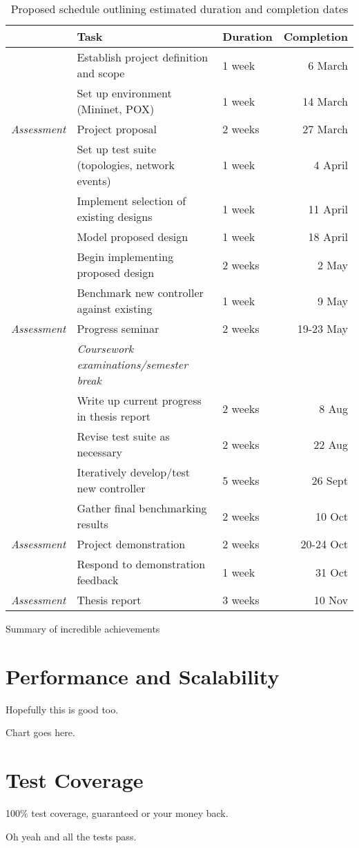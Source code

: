 \begin{table}[H]
  \begin{center}
    \begin{tabular}{@{}rllr@{}}
      \toprule
      & Task & Duration & Completion\\
      \midrule
      & Establish project definition and scope & 1 week & 6 March \\
      & Set up environment (Mininet,  POX) & 1 week & 14 March \\
      \emph{Assessment} & Project proposal & 2 weeks & 27 March \\
      & Set up test suite (topologies, network events) & 1 week & 4 April \\
      & Implement selection of existing designs & 1 week & 11 April \\
      & Model proposed design & 1 week & 18 April \\
      & Begin implementing proposed design & 2 weeks & 2 May \\
      & Benchmark new controller against existing & 1 week & 9 May \\
      \emph{Assessment} & Progress seminar & 2 weeks & 19-23 May \\
      \addlinespace
      & \emph{Coursework examinations/semester break} \\
      \addlinespace
      & Write up current progress in thesis report & 2 weeks & 8 Aug\\
      & Revise test suite as necessary & 2 weeks & 22 Aug\\
      & Iteratively develop/test new controller & 5 weeks & 26 Sept\\
      & Gather final benchmarking results & 2 weeks & 10 Oct \\
      \emph{Assessment} & Project demonstration & 2 weeks & 20-24 Oct \\
      & Respond to demonstration feedback & 1 week & 31 Oct \\
      \emph{Assessment} & Thesis report & 3 weeks & 10 Nov \\
      \bottomrule
    \end{tabular}
    \caption{Proposed schedule outlining estimated duration and completion dates}
    \label{table:schedule}
  \end{center}
\end{table}

\begin{table}
\caption{Summary of incredible achievements}
\end{table}

\section{Performance and Scalability}
Hopefully this is good too.

Chart goes here.

\section{Test Coverage}
100\% test coverage, guaranteed or your money back.

Oh yeah and all the tests pass.
